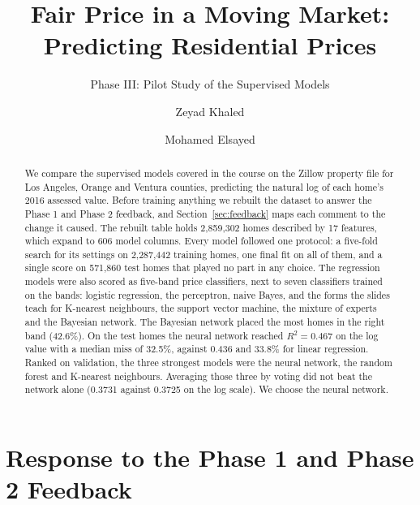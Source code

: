 \documentclass[sigconf,nonacm,10pt]{acmart}
\begin{document}
\title{Fair Price in a Moving Market: Predicting Residential Prices}
\subtitle{Phase III: Pilot Study of the Supervised Models}

\author{Zeyad Khaled}

\author{Mohamed Elsayed}

\begin{abstract}
We compare the supervised models covered in the course on the Zillow property file for Los Angeles, Orange and Ventura counties, predicting the natural log of each home's 2016 assessed value. Before training anything we rebuilt the dataset to answer the Phase 1 and Phase 2 feedback, and Section~\ref{sec:feedback} maps each comment to the change it caused. The rebuilt table holds 2,859,302 homes described by 17 features, which expand to 606 model columns. Every model followed one protocol: a five-fold search for its settings on 2,287,442 training homes, one final fit on all of them, and a single score on 571,860 test homes that played no part in any choice. The regression models were also scored as five-band price classifiers, next to seven classifiers trained on the bands: logistic regression, the perceptron, naive Bayes, and the forms the slides teach for K-nearest neighbours, the support vector machine, the mixture of experts and the Bayesian network. The Bayesian network placed the most homes in the right band (42.6\%). On the test homes the neural network reached $R^2 = 0.467$ on the log value with a median miss of 32.5\%, against 0.436 and 33.8\% for linear regression. Ranked on validation, the three strongest models were the neural network, the random forest and K-nearest neighbours. Averaging those three by voting did not beat the network alone (0.3731 against 0.3725 on the log scale). We choose the neural network.
\end{abstract}


\maketitle

\section{Response to the Phase 1 and Phase 2 Feedback}
\label{sec:feedback}
\end{document}
